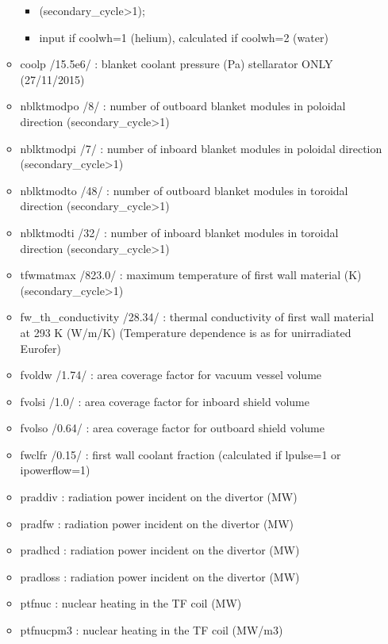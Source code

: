 \documentclass[]{article}
\providecommand{\tightlist}{%
  \setlength{\itemsep}{0pt}\setlength{\parskip}{0pt}}
\begin{document}
\begin{itemize}
\begin{itemize}
    \begin{itemize}
    \tightlist
    \item
      (secondary\_cycle\textgreater{}1);
    \item
      input if coolwh=1 (helium), calculated if coolwh=2 (water)
    \end{itemize}
  \item
    coolp /15.5e6/ : blanket coolant pressure (Pa) stellarator ONLY
    (27/11/2015)
  \item
    nblktmodpo /8/ : number of outboard blanket modules in poloidal
    direction (secondary\_cycle\textgreater{}1)
  \item
    nblktmodpi /7/ : number of inboard blanket modules in poloidal
    direction (secondary\_cycle\textgreater{}1)
  \item
    nblktmodto /48/ : number of outboard blanket modules in toroidal
    direction (secondary\_cycle\textgreater{}1)
  \item
    nblktmodti /32/ : number of inboard blanket modules in toroidal
    direction (secondary\_cycle\textgreater{}1)
  \item
    tfwmatmax /823.0/ : maximum temperature of first wall material (K)
    (secondary\_cycle\textgreater{}1)
  \item
    fw\_th\_conductivity /28.34/ : thermal conductivity of first wall
    material at 293 K (W/m/K) (Temperature dependence is as for
    unirradiated Eurofer)
  \item
    fvoldw /1.74/ : area coverage factor for vacuum vessel volume
  \item
    fvolsi /1.0/ : area coverage factor for inboard shield volume
  \item
    fvolso /0.64/ : area coverage factor for outboard shield volume
  \item
    fwclfr /0.15/ : first wall coolant fraction (calculated if lpulse=1
    or ipowerflow=1)
  \item
    praddiv : radiation power incident on the divertor (MW)
  \item
    pradfw : radiation power incident on the divertor (MW)
  \item
    pradhcd : radiation power incident on the divertor (MW)
  \item
    pradloss : radiation power incident on the divertor (MW)
  \item
    ptfnuc : nuclear heating in the TF coil (MW)
  \item
    ptfnucpm3 : nuclear heating in the TF coil (MW/m3)

\end{itemize}
\end{itemize}
\end{document}
